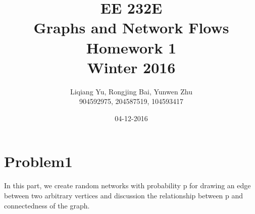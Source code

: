 \documentclass{article}
\begin{document}
\begin{titlepage}
\title{EE 232E \\Graphs and Network Flows\\Homework 1\\Winter 2016} 
\author{Liqiang Yu, Rongjing Bai, Yunwen Zhu\\
904592975, 204587519, 104593417}  %
\date{04-12-2016}
\end{titlepage}

\maketitle
\newpage
\tableofcontents
\newpage

\section{Problem1}\label{prob:p1}
In this part, we create random networks with probability p for drawing an edge between two arbitrary vertices and discussion the relationship between p and connectedness of the graph.
\end{document}
